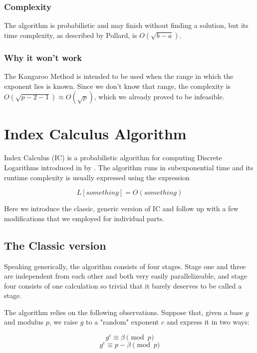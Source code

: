 \documentclass{article}
\begin{document}
        \subsubsection{Complexity}

        The algorithm is probabilistic and may finish without finding a solution, but its time complexity, as described by Pollard, is $O(\sqrt{b-a})$.

        \subsubsection{Why it won't work}

        The Kangaroo Method is intended to be used when the range in which the exponent lies is known. Since we don't know that range, the complexity is $O(\sqrt{p - 2 - 1}) \approx O(\sqrt{p})$, which we already proved to be infeasible.


        \section{Index Calculus Algorithm}

        Index Calculus (IC) is a probabilistic algorithm for computing Discrete Logarithms introduced in by \autocite{Adelman1979}. The algorithm runs in subexponential time and its runtime complexity is usually expressed using the expression

        $$L[something] = O(something)$$

        Here we introduce the classic, generic version of IC and follow up with a few modifications that we employed for individual parts.

        \subsection{The Classic version}

        Speaking generically, the algorithm consists of four stages. Stage one and three are independent from each other and both very easily parallelizeable, and stage four consists of one calculation so trivial that it barely deserves to be called a stage.

        The algorithm relies on the following observations. Suppose that, given a base $g$ and modulus $p$, we raise $g$ to a "random" exponent $c$ and express it in two ways:

        $$g^c \equiv \beta \pmod{p}$$
        $$g^c \equiv p - \beta \pmod{p}$$
\end{document}
